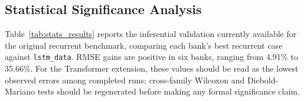 \begin{table}[t]
\centering
\caption{Best case per bank across original recurrent, recurrent variants, and Transformers.}
\label{tab:bank_family_best}
\scriptsize
\setlength{\tabcolsep}{2pt}
\end{table}

\subsection{Statistical Significance Analysis}
Table~\ref{tab:stats_results} reports the inferential validation currently available for the original recurrent benchmark, comparing each bank's best recurrent case against \texttt{lstm\_data}. RMSE gains are positive in six banks, ranging from 4.91\% to 35.66\%. For the Transformer extension, these values should be read as the lowest observed errors among completed runs; cross-family Wilcoxon and Diebold-Mariano tests should be regenerated before making any formal significance claim.

